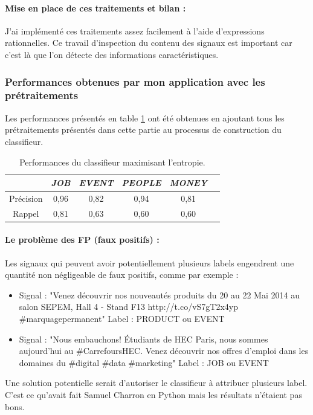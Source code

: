                 \paragraph{Mise en place de ces traitements et bilan :}
                    J'ai implémenté ces traitements assez facilement à l'aide d'expressions rationnelles. Ce travail d'inspection du contenu des signaux est important car c'est là que l'on détecte des informations caractéristiques.

            \subsubsection{Performances obtenues par mon application avec les prétraitements}
                Les performances présentés en table \ref{tab:classif_perf4} ont été obtenues en ajoutant tous les prétraitements présentés dans cette partie au processus de construction du classifieur.
                \begin{table}[t]
                    \centering
                    \begin{tabular}{| c | c | c | c | c | c |}
                        \hline
                         & \textit{JOB} & \textit{EVENT} & \textit{PEOPLE} & \textit{MONEY} \\
                        \hline
                        Précision & 0,96 & 0,82 & 0,94 & 0,81 \\
                        Rappel & 0,81 & 0,63 & 0,60 & 0,60 \\
                        \hline
                    \end{tabular}
                    \caption{Performances du classifieur maximisant l'entropie.}
                    \label{tab:classif_perf4}
                \end{table}


                \paragraph{Le problème des FP (faux positifs) :}
                    Les signaux qui peuvent avoir potentiellement plusieurs labels engendrent une quantité non négligeable de faux positifs, comme par exemple :
                    \begin{itemize}
                        \item Signal : "Venez découvrir nos nouveautés produits du 20 au 22 Mai 2014 au salon SEPEM, Hall 4 - Stand F13 http://t.co/vS7gT2x4yp \#marquagepermanent" Label : PRODUCT ou EVENT
                        \item Signal : "Nous embauchons! Étudiants de HEC Paris, nous sommes aujourd'hui au \#CarrefoursHEC. Venez découvrir nos offres d'emploi dans les domaines du \#digital \#data \#marketing" Label : JOB ou EVENT
                    \end{itemize}
                    Une solution potentielle serait d'autoriser le classifieur à attribuer plusieurs label. C'est ce qu'avait fait Samuel Charron en Python mais les résultats n'étaient pas bons.

